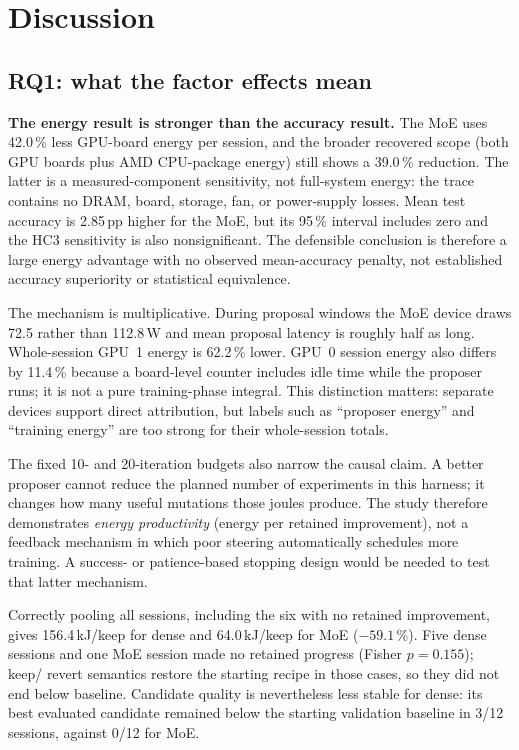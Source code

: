 \section{Discussion}\label{sec:discussion}

\subsection{RQ1: what the factor effects mean}

\textbf{The energy result is stronger than the accuracy result.} The MoE uses
42.0\,\% less GPU-board energy per session, and the broader recovered scope
(both GPU boards plus AMD CPU-package energy) still shows a 39.0\,\% reduction.
The latter is a measured-component sensitivity, not full-system energy: the trace
contains no DRAM, board, storage, fan, or power-supply losses. Mean test accuracy
is 2.85\,pp higher for the MoE, but its 95\,\% interval includes zero and the HC3
sensitivity is also nonsignificant. The defensible conclusion is therefore a
large energy advantage with no observed mean-accuracy penalty, not established
accuracy superiority or statistical equivalence.

The mechanism is multiplicative. During proposal windows the MoE device draws
72.5 rather than 112.8\,W and mean proposal latency is roughly half as long.
Whole-session GPU~1 energy is 62.2\,\% lower. GPU~0 session energy also differs
by 11.4\,\% because a board-level counter includes idle time while the proposer
runs; it is not a pure training-phase integral. This distinction matters: separate
devices support direct attribution, but labels such as ``proposer energy'' and
``training energy'' are too strong for their whole-session totals.

The fixed 10- and 20-iteration budgets also narrow the causal claim. A better
proposer cannot reduce the planned number of experiments in this harness; it
changes how many useful mutations those joules produce. The study therefore
demonstrates \emph{energy productivity} (energy per retained improvement), not a
feedback mechanism in which poor steering automatically schedules more training.
A success- or patience-based stopping design would be needed to test that latter
mechanism.

Correctly pooling all sessions, including the six with no retained improvement,
gives 156.4\,kJ/keep for dense and 64.0\,kJ/keep for MoE ($-59.1\,\%$). Five dense
sessions and one MoE session made no retained progress (Fisher $p=0.155$); keep/
revert semantics restore the starting recipe in those cases, so they did not end
below baseline. Candidate quality is nevertheless less stable for dense: its
best evaluated candidate remained below the starting validation baseline in
3/12 sessions, against 0/12 for MoE.

